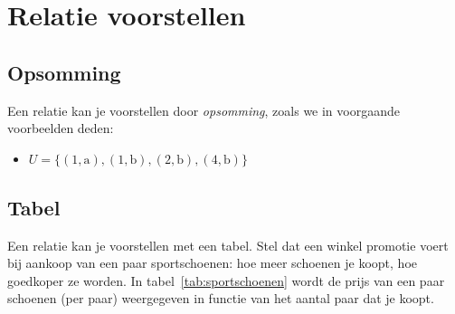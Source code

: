 %
%
%
%
%


\section{Relatie voorstellen}
\label{sec:relatieVoorstellen}
\subsection{Opsomming}
Een  relatie kan je voorstellen door \emph{opsomming}, zoals we in voorgaande voorbeelden deden:
\begin{itemize}
\item $U=\{(1,\mathrm{a}),(1,\mathrm{b}),(2,\mathrm{b}),(4,\mathrm{b}) \}$
\end{itemize}

\subsection{Tabel}
Een relatie kan je voorstellen met een tabel. Stel dat een winkel promotie voert bij aankoop van een paar sportschoenen: hoe meer schoenen je koopt, hoe goedkoper  ze worden. In tabel~\ref{tab:sportschoenen} wordt de prijs van een paar schoenen (per paar) weergegeven in functie van het aantal paar dat je koopt.

